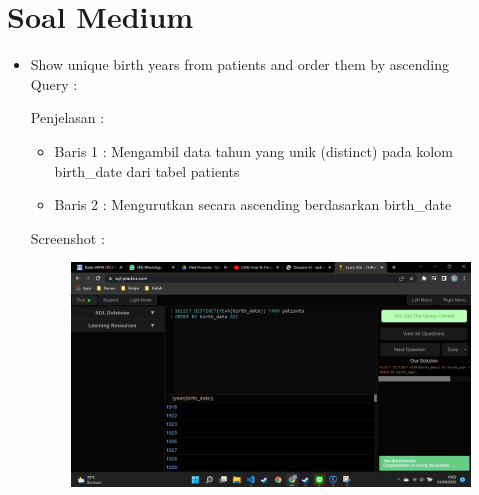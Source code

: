\documentclass[]{article}
\begin{document}
\section{Soal Medium}
    \begin{itemize}
        \item Show unique birth years from patients and order them by ascending
        \\Query : 
        
        Penjelasan :
        \begin{itemize}
            \item Baris 1 : Mengambil data tahun yang unik (distinct) pada kolom birth\_date dari tabel patients 
            \item Baris 2 : Mengurutkan secara ascending berdasarkan birth\_date
        \end{itemize}
        Screenshot :
        \begin{figure}[h]
            \includegraphics[scale=0.3]{./Screenshot/Medium-1.png}
            \centering
        \end{figure}


\end{itemize}
\end{document}

